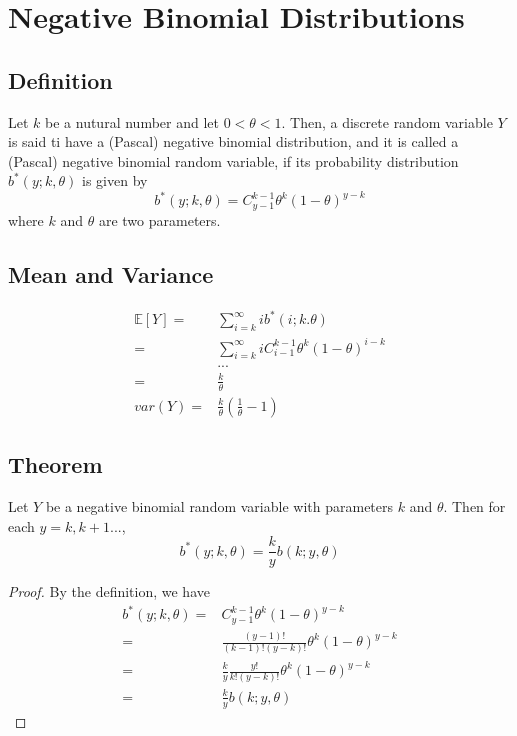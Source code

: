 \documentclass[titlepage]{article}
\begin{document}
    \section{Negative Binomial Distributions}
        \subsection*{Definition}
                Let $k$ be a nutural number and let $0<\theta<1$. Then, a discrete random variable $Y$ is said ti have a (Pascal) negative binomial distribution, and it is called a (Pascal) negative binomial random variable, if its probability distribution $b^*(y;k,\theta)$ is given by
                $$b^*(y;k,\theta)=C_{y-1}^{k-1}\theta^k(1-\theta)^{y-k}$$
                where $k$ and $\theta$ are two parameters.

        \subsection*{Mean and Variance}
            \begin{equation*}
                \begin{split}
                    \mathbb{E}[Y]=&\sum_{i=k}^\infty ib^*(i;k.\theta)\\
                        =&\sum_{i=k}^\infty iC_{i-1}^{k-1}\theta^k(1-\theta)^{i-k}\\
                        &...\\
                        =&\frac{k}{\theta}\\
                    var(Y)=&\frac{k}{\theta}(\frac{1}{\theta}-1)
                \end{split}
            \end{equation*}

        \subsection*{Theorem}
            Let $Y$ be a negative binomial random variable with parameters $k$ and $\theta$. Then for each $y=k,k+1...$,
            $$b^*(y;k,\theta)=\frac{k}{y}b(k;y,\theta)$$
            \begin{proof}
                By the definition, we have 
                \begin{equation*}
                    \begin{split}
                        b^*(y;k,\theta)=&C_{y-1}^{k-1}\theta^k(1-\theta)^{y-k}\\
                            =&\frac{(y-1)!}{(k-1)!(y-k)!}\theta^k(1-\theta)^{y-k}\\
                            =&\frac{k}{y}\frac{y!}{k!(y-k)!}\theta^k(1-\theta)^{y-k}\\
                            =&\frac{k}{y}b(k;y,\theta)
                    \end{split}
                \end{equation*}
            \end{proof}
\end{document}
